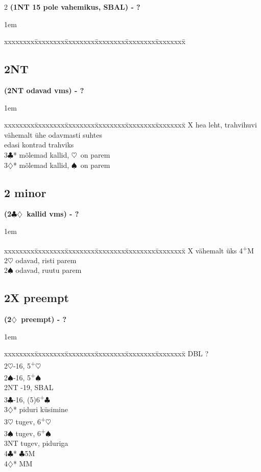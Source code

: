 \documentclass[10pt]{article}
\renewcommand{\c}{$\clubsuit$}
\renewcommand{\d}{$\diamondsuit$}
\newcommand{\h}{$\heartsuit$}
\newcommand{\s}{$\spadesuit$}
\newcommand{\p}{\textsuperscript{+}}
\newcommand{\x}{DBL}
\newenvironment{bidtable}[1][]
{\textbf{#1}
  \begin{adjustwidth}{1em}{}
    \addvspace{2pt}
    \begin{tabbing}
      xxxxxxxx\=xxxxxxxx\=xxxxxxxx\=xxxxxxxx\=xxxxxxxx\=xxxxxxxx\=\kill}
{\end{tabbing}\end{adjustwidth}\bigskip}%
\begin{document}
\begin{multicols*}{2}
\begin{bidtable}[(1NT 15 pole vahemikus, SBAL) - ?]
\end{bidtable}

\subsection{2NT}

\begin{bidtable}[(2NT odavad vms) - ?]
X    \> hea leht, trahvihuvi vähemalt ühe odavmasti suhtes \\
     \> edasi kontrad trahviks                             \\
3\c* \> mõlemad kallid, \h\ on parem                       \\
3\d* \> mõlemad kallid, \s\ on parem
\end{bidtable}

\subsection{2 minor}

\begin{bidtable}[(2\c\d\ kallid vms) - ?]
X   \> vähemalt üks 4\p M     \\
2\h {} odavad, risti parem \\
2\s {} odavad, ruutu parem
\end{bidtable}

\newpage
\subsection{2X preempt}

\begin{bidtable}[(2\d\ preempt) - ?]
\x   \> ?               \\
2\h  {}-16, 5\p\h    \\
2\s  {}-16, 5\p\s    \\
2NT  -19, SBAL     \\
3\c  {}-16, (5)6\p\c \\
3\d* \> piduri küsimine \\
3\h  \> tugev, 6\p\h    \\
3\s  \> tugev, 6\p\s    \\
3NT  \> tugev, piduriga \\
4\c* {}\c 5M          \\
4\d* {} MM
\end{bidtable}


\end{multicols*}
\end{document}
